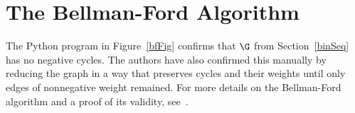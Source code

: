 \appendix
\section{The Bellman-Ford Algorithm} \label{bfAlg}
The Python program in Figure~\ref{bfFig} confirms that $\G$ from
Section~\ref{binSeq} has no negative cycles. The authors have also confirmed
this manually by reducing the graph in a way that preserves cycles and their
weights until only edges of nonnegative weight remained. For more details on
the Bellman-Ford algorithm and a proof of its validity, see~\cite{bellmanford}.
